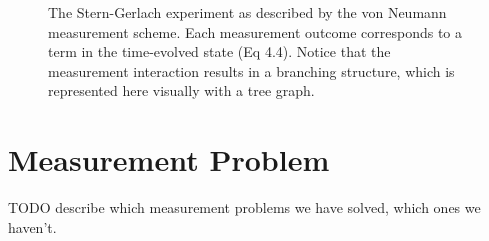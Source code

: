 \begin{figure}
\begin{adjustbox}{width=\textwidth}
\end{adjustbox}

\caption[Insert an abbreviated caption here to show in the List of Figures]
{The Stern-Gerlach experiment as described by the von Neumann measurement scheme. Each measurement outcome corresponds to a term in the time-evolved state (Eq 4.4). Notice that the measurement interaction results in a branching structure, which is represented here visually with a tree graph. }
\label{Figure:Measurement:labelthis}
\end{figure}

\section{Measurement Problem}
TODO describe which measurement problems we have solved, which ones we haven't.
%
%
